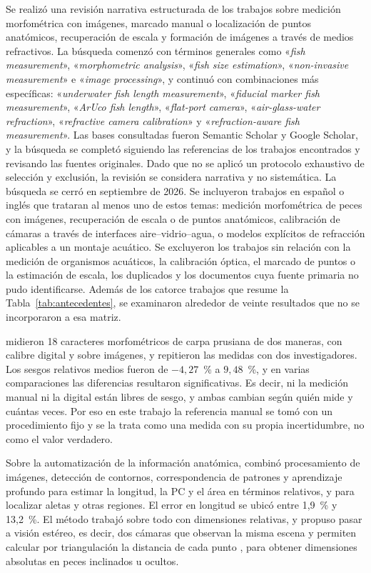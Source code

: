 Se realizó una revisión narrativa estructurada de los trabajos sobre medición morfométrica con imágenes, marcado manual o localización de puntos anatómicos, recuperación de escala y formación de imágenes a través de medios refractivos. La búsqueda comenzó con términos generales como «\emph{fish measurement}», «\emph{morphometric analysis}», «\emph{fish size estimation}», «\emph{non-invasive measurement}» e «\emph{image processing}», y continuó con combinaciones más específicas: «\emph{underwater fish length measurement}», «\emph{fiducial marker fish measurement}», «\emph{ArUco fish length}», «\emph{flat-port camera}», «\emph{air-glass-water refraction}», «\emph{refractive camera calibration}» y «\emph{refraction-aware fish measurement}». Las bases consultadas fueron Semantic Scholar y Google Scholar, y la búsqueda se completó siguiendo las referencias de los trabajos encontrados y revisando las fuentes originales. Dado que no se aplicó un protocolo exhaustivo de selección y exclusión, la revisión se considera narrativa y no sistemática. La búsqueda se cerró en septiembre de 2026. Se incluyeron trabajos en español o inglés que trataran al menos uno de estos temas: medición morfométrica de peces con imágenes, recuperación de escala o de puntos anatómicos, calibración de cámaras a través de interfaces aire--vidrio--agua, o modelos explícitos de refracción aplicables a un montaje acuático. Se excluyeron los trabajos sin relación con la medición de organismos acuáticos, la calibración óptica, el marcado de puntos o la estimación de escala, los duplicados y los documentos cuya fuente primaria no pudo identificarse. Además de los catorce trabajos que resume la Tabla~\ref{tab:antecedentes}, se examinaron alrededor de veinte resultados que no se incorporaron a esa matriz.

\textcite{Petrtyl2014} midieron 18 caracteres morfométricos de carpa prusiana de dos maneras, con calibre digital y sobre imágenes, y repitieron las medidas con dos investigadores. Los sesgos relativos medios fueron de $-4{,}27$~\% a $9{,}48$~\%, y en varias comparaciones las diferencias resultaron significativas. Es decir, ni la medición manual ni la digital están libres de sesgo, y ambas cambian según quién mide y cuántas veces. Por eso en este trabajo la referencia manual se tomó con un procedimiento fijo y se la trata como una medida con su propia incertidumbre, no como el valor verdadero.

Sobre la automatización de la información anatómica, \textcite{Petrellis2021} combinó procesamiento de imágenes, detección de contornos, correspondencia de patrones y aprendizaje profundo para estimar la longitud, la PC y el área en términos relativos, y para localizar aletas y otras regiones. El error en longitud se ubicó entre 1,9~\% y 13,2~\%. El método trabajó sobre todo con dimensiones relativas, y \citeauthor{Petrellis2021} propuso pasar a visión estéreo, es decir, dos cámaras que observan la misma escena y permiten calcular por triangulación la distancia de cada punto \parencite{Hartley2004}, para obtener dimensiones absolutas en peces inclinados u ocultos.

